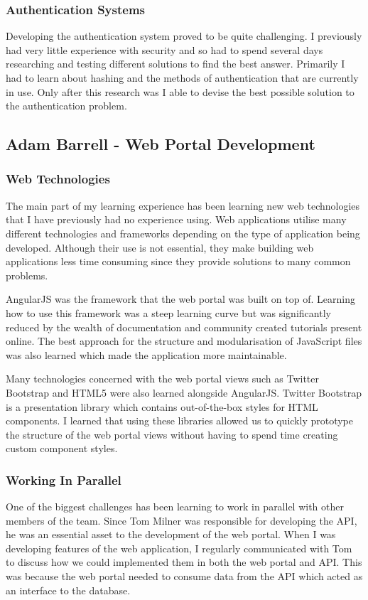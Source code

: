 \documentclass[11pt,a4paper]{report}
\begin{document}
\subsubsection{Authentication Systems}
Developing the authentication system proved to be quite challenging. I previously had very little experience with security and so had to spend several days researching and testing different solutions to find the best answer. Primarily I had to learn about hashing and the methods of authentication that are currently in use. Only after this research was I able to devise the best possible solution to the authentication problem. 

\subsection{Adam Barrell - Web Portal Development}

\subsubsection{Web Technologies}
The main part of my learning experience has been learning new web technologies that I have previously had no experience using. Web applications utilise many different technologies and frameworks depending on the type of application being developed. Although their use is not essential, they make building web applications less time consuming since they provide solutions to many common problems.

AngularJS was the framework that the web portal was built on top of. Learning how to use this framework was a steep learning curve but was significantly reduced by the wealth of documentation and community created tutorials present online. The best approach for the structure and modularisation of JavaScript files was also learned which made the application more maintainable. 

Many technologies concerned with the web portal views such as Twitter Bootstrap and HTML5 were also learned alongside AngularJS. Twitter Bootstrap is a presentation library which contains out-of-the-box styles for HTML components. I learned that using these libraries allowed us to quickly prototype the structure of the web portal views without having to spend time creating custom component styles.

\subsubsection{Working In Parallel}
One of the biggest challenges has been learning to work in parallel with other members of the team. Since Tom Milner was responsible for developing the API, he was an essential asset to the development of the web portal. When I was developing features of the web application, I regularly communicated with Tom to discuss how we could implemented them in both the web portal and API. This was because the web portal needed to consume data from the API which acted as an interface to the database.
\end{document}
